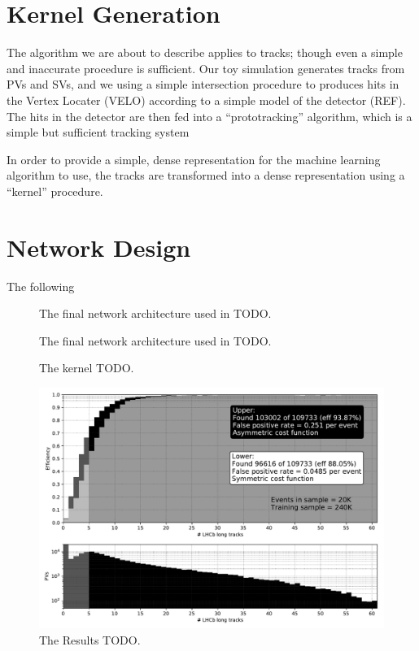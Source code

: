 \documentclass[a4paper]{jpconf}
\begin{document}
\section{Kernel Generation}

The algorithm we are about to describe applies to tracks; though even a simple and inaccurate procedure is sufficient. Our toy simulation generates tracks from PVs and SVs, and we using a simple intersection procedure to produces hits in the Vertex Locater (VELO) according to a simple model of the detector (REF). The hits in the detector are then fed into a ``prototracking'' algorithm, which is a simple but sufficient tracking system 

In order to provide a simple, dense representation for the machine learning algorithm to use, the tracks are transformed into a dense representation using a ``kernel'' procedure. 

\section{Network Design}

The following 

\begin{figure}
   \centering
   
   \caption{The final network architecture used in TODO.}
   \label{fig:nnarch}
\end{figure}

\begin{figure}
  \centering
  
  \caption{The final network architecture used in TODO.}
  \label{fig:approach}
\end{figure}

\begin{figure}
	\centering
	
	\caption{The kernel TODO.}
	\label{fig:kernel}
\end{figure}

\begin{figure}
	\centering
	\includegraphics[width=\textwidth]{images/effntrackspaper.pdf}
	\caption{The Results TODO.}
    \label{fig:results}
\end{figure}
\end{document}
